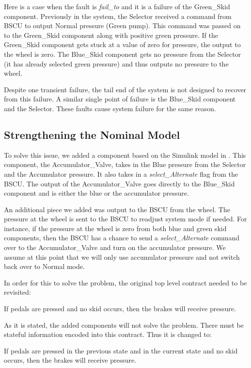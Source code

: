Here is a case when the fault is \textit{fail\_to} and it is a failure of the Green\_Skid component. Previously in the system, the Selector received a command from BSCU to output Normal pressure (Green pump). This command was passed on to the Green\_Skid component along with positive green pressure. If the Green\_Skid component gets stuck at a value of zero for pressure, the output to the wheel is zero. The Blue\_Skid component gets no pressure from the Selector (it has already selected green pressure) and thus outputs no pressure to the wheel. 

Despite one transient failure, the tail end of the system is not designed to recover from this failure. A similar single point of failure is the Blue\_Skid component and the Selector. These faults cause system failure for the same reason. 

\subsection{Strengthening the Nominal Model}

To solve this issue, we added a component based on the Simulink model in \cite{Joshi05:Dasc}. This component, the Accumulator\_Valve, takes in the Blue pressure from the Selector and the Accumulator pressure. It also takes in a \textit{select\_Alternate} flag from the BSCU. The output of the Accumulator\_Valve goes directly to the Blue\_Skid component and is either the blue or the accumulator pressure. 

An additional piece we added was output to the BSCU from the wheel. The pressure at the wheel is sent to the BSCU to readjust system mode if needed. For instance, if the pressure at the wheel is zero from both blue and green skid components, then the BSCU has a chance to send a \textit{select\_Alternate} command over to the Accumulator\_Valve and turn on the accumulator pressure. We assume at this point that we will only use accumulator pressure and not switch back over to Normal mode. 

In order for this to solve the problem, the original top level contract needed to be revisited: 

\begin{tt}
If pedals are pressed and no skid occurs, then the brakes will receive pressure. 
\end{tt}

As it is stated, the added components will not solve the problem. There must be stateful information encoded into this contract. Thus it is changed to: 

\begin{tt}
If pedals are pressed in the previous state and in the current state and no skid occurs, then the brakes will receive pressure. 
\end{tt}
















